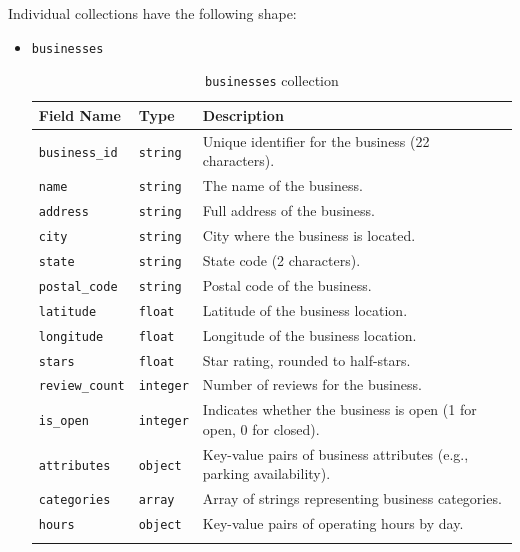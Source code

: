 \documentclass{Configuration_Files/PoliMi3i_thesis}
\begin{document}
Individual collections have the following shape:
\begin{itemize}

\item{\texttt{businesses}}
\begin{longtable}{|p{3cm}|p{2.5cm}|p{10cm}|}
\hline
\textbf{Field Name} & \textbf{Type} & \textbf{Description} \\ \hline
\texttt{business\_id} & \texttt{string} & Unique identifier for the business (22 characters). \\ \hline
\texttt{name} & \texttt{string} & The name of the business. \\ \hline
\texttt{address} & \texttt{string} & Full address of the business. \\ \hline
\texttt{city} & \texttt{string} & City where the business is located. \\ \hline
\texttt{state} & \texttt{string} & State code (2 characters). \\ \hline
\texttt{postal\_code} & \texttt{string} & Postal code of the business. \\ \hline
\texttt{latitude} & \texttt{float} & Latitude of the business location. \\ \hline
\texttt{longitude} & \texttt{float} & Longitude of the business location. \\ \hline
\texttt{stars} & \texttt{float} & Star rating, rounded to half-stars. \\ \hline
\texttt{review\_count} & \texttt{integer} & Number of reviews for the business. \\ \hline
\texttt{is\_open} & \texttt{integer} & Indicates whether the business is open (1 for open, 0 for closed). \\ \hline
\texttt{attributes} & \texttt{object} & Key-value pairs of business attributes (e.g., parking availability). \\ \hline
\texttt{categories} & \texttt{array} & Array of strings representing business categories. \\ \hline
\texttt{hours} & \texttt{object} & Key-value pairs of operating hours by day. \\ \hline
\caption{\texttt{businesses} collection}
\end{longtable}


\end{itemize}
\end{document}
